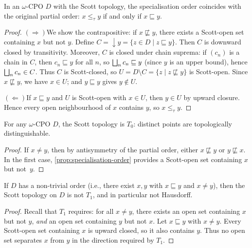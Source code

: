 \begin{proposition}
\label{prop:specialisation-order}
In an $\omega$-CPO $D$ with the Scott topology, the specialisation order
coincides with the original partial order: $x \leq_\tau y$ if and only
if $x \sqsubseteq y$.
\end{proposition}

\begin{proof}
$(\Rightarrow)$\quad We show the contrapositive: if $x \not\sqsubseteq y$,
there exists a Scott-open set containing $x$ but not $y$. Define
$C = {\downarrow}y = \{z \in D \mid z \sqsubseteq y\}$. Then $C$ is
downward closed by transitivity. Moreover, $C$ is closed under chain
suprema: if $(c_n)$ is a chain in $C$, then $c_n \sqsubseteq y$ for all
$n$, so $\bigsqcup_n c_n \sqsubseteq y$ (since $y$ is an upper bound), hence
$\bigsqcup_n c_n \in C$. Thus $C$ is Scott-closed, so
$U = D \setminus C = \{z \mid z \not\sqsubseteq y\}$ is Scott-open.
Since $x \not\sqsubseteq y$, we have $x \in U$; and $y \sqsubseteq y$
gives $y \notin U$.

$(\Leftarrow)$\quad If $x \sqsubseteq y$ and $U$ is Scott-open with
$x \in U$, then $y \in U$ by upward closure. Hence every open
neighbourhood of $x$ contains $y$, so $x \leq_\tau y$.
\end{proof}

\begin{corollary}
\label{cor:scott-T0}
For any $\omega$-CPO $D$, the Scott topology is $T_0$: distinct points
are topologically distinguishable.
\end{corollary}

\begin{proof}
If $x \neq y$, then by antisymmetry of the partial order, either
$x \not\sqsubseteq y$ or $y \not\sqsubseteq x$. In the first case,
\cref{prop:specialisation-order} provides a Scott-open set containing
$x$ but not~$y$.
\end{proof}

\begin{proposition}
\label{prop:scott-not-T1}
If $D$ has a non-trivial order (i.e., there exist $x, y$ with
$x \sqsubseteq y$ and $x \neq y$), then the Scott topology on $D$ is not $T_1$, and
in particular not Hausdorff.
\end{proposition}

\begin{proof}
Recall that $T_1$ requires: for all $x \neq y$, there exists an open
set containing $x$ but not $y$, \emph{and} an open set containing $y$
but not $x$. Let $x \sqsubseteq y$ with $x \neq y$. Every Scott-open set containing
$x$ is upward closed, so it also contains $y$. Thus no open set
separates $x$ from $y$ in the direction required by $T_1$.
\end{proof}


